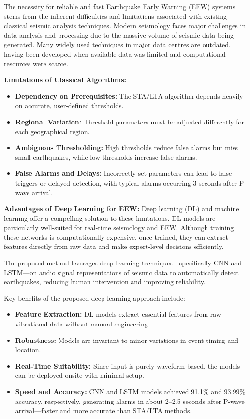 {\fontsize{12pt}{18pt}\selectfont
The necessity for reliable and fast Earthquake Early Warning (EEW) systems stems from the inherent difficulties and limitations associated with existing classical seismic analysis techniques. Modern seismology faces major challenges in data analysis and processing due to the massive volume of seismic data being generated. Many widely used techniques in major data centres are outdated, having been developed when available data was limited and computational resources were scarce.

\textbf{Limitations of Classical Algorithms:}
\begin{itemize}
    \item \textbf{Dependency on Prerequisites:} The STA/LTA algorithm depends heavily on accurate, user-defined thresholds.
    \item \textbf{Regional Variation:} Threshold parameters must be adjusted differently for each geographical region.
    \item \textbf{Ambiguous Thresholding:} High thresholds reduce false alarms but miss small earthquakes, while low thresholds increase false alarms.
    \item \textbf{False Alarms and Delays:} Incorrectly set parameters can lead to false triggers or delayed detection, with typical alarms occurring 3 seconds after P-wave arrival.
\end{itemize}

\vspace{0.2cm}
\textbf{Advantages of Deep Learning for EEW:}
Deep learning (DL) and machine learning offer a compelling solution to these limitations. DL models are particularly well-suited for real-time seismology and EEW. Although training these networks is computationally expensive, once trained, they can extract features directly from raw data and make expert-level decisions efficiently.

The proposed method leverages deep learning techniques—specifically CNN and LSTM—on audio signal representations of seismic data to automatically detect earthquakes, reducing human intervention and improving reliability.

Key benefits of the proposed deep learning approach include:
\begin{itemize}
    \item \textbf{Feature Extraction:} DL models extract essential features from raw vibrational data without manual engineering.
    \item \textbf{Robustness:} Models are invariant to minor variations in event timing and location.
    \item \textbf{Real-Time Suitability:} Since input is purely waveform-based, the models can be deployed onsite with minimal setup.
    \item \textbf{Speed and Accuracy:} CNN and LSTM models achieved 91.1\% and 93.99\% accuracy, respectively, generating alarms in about 2–2.5 seconds after P-wave arrival—faster and more accurate than STA/LTA methods.
\end{itemize}

}
